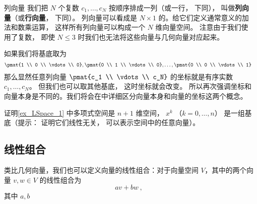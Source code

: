 
\begin{exercise}{列向量}
我们把 $N$ 个复数 $c_1, \dots, c_N$ 按顺序排成一列（或一行， 下同）， 叫做\textbf{列向量}（或\textbf{行向量}， 下同）。 列向量可以看成是 $N \times 1$ 的。给它们定义通常意义的加法和数乘运算， 这样所有列向量可以构成一个 $N$ 维向量空间。 注意由于我们使用了复数， 即使 $N \leqslant 3$ 时我们也无法将这些向量与几何向量对应起来。

如果我们将基底取为
$$
\pmat{1 \\ 0 \\ \vdots \\ 0}, \pmat{0 \\ 1 \\ \vdots \\ 0}, \dots, \pmat{0 \\ 0 \\ \vdots \\ 1}~
$$
那么显然任意列向量 $\pmat{c_1 \\ \vdots \\ c_N}$ 的坐标就是有序实数 $c_1, \dots, c_N$。 但我们也可以取其他基底， 这时坐标就会改变。 所以再次强调坐标和向量本身是不同的。我们将会在中详细区分向量本身和向量的坐标这两个概念。
\end{exercise}

\begin{exercise}{}
证明\autoref{ex_LSpace_1} 中多项式空间是 $n+1$ 维空间， $x^k$ （$k = 0, \dots, n$） 是一组基底（提示： 证明它们线性无关， 可以表示空间中的任意向量）。
\end{exercise}


\subsection{线性组合}

类比几何向量，我们也可以定义向量的线性组合：对于向量空间 $V$，其中的两个向量 $v, w \in V$ 的线性组合为
$$
a v + b w ~,
$$
其中 $a, b$